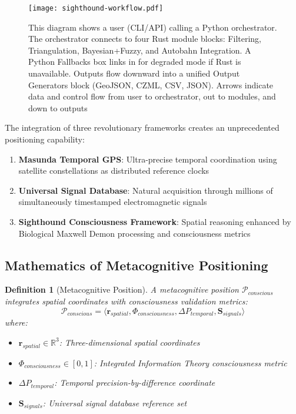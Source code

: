 \documentclass[12pt,a4paper]{article}
\newtheorem{definition}[theorem]{Definition}
\newcommand{\R}{\mathbb{R}}
\begin{document}
\begin{figure}[H]
\centering
\texttt{[image: sighthound-workflow.pdf]}
\caption{This diagram shows a user (CLI/API) calling a Python orchestrator. The orchestrator connects to four Rust module blocks: Filtering, Triangulation, Bayesian+Fuzzy, and Autobahn Integration. A Python Fallbacks box links in for degraded mode if Rust is unavailable. Outputs flow downward into a unified Output Generators block (GeoJSON, CZML, CSV, JSON). Arrows indicate data and control flow from user to orchestrator, out to modules, and down to outputs}
\label{fig:sighthound-workflow}
\end{figure}

The integration of three revolutionary frameworks creates an unprecedented positioning capability:

\begin{enumerate}
\item \textbf{Masunda Temporal GPS}: Ultra-precise temporal coordination using satellite constellations as distributed reference clocks \cite{masunda2025temporal}
\item \textbf{Universal Signal Database}: Natural acquisition through millions of simultaneously timestamped electromagnetic signals \cite{masunda2025signal}
\item \textbf{Sighthound Consciousness Framework}: Spatial reasoning enhanced by Biological Maxwell Demon processing and consciousness metrics \cite{sachikonye2025buhera}
\end{enumerate}

\subsection{Mathematics of Metacognitive Positioning}

\begin{definition}[Metacognitive Position]
A metacognitive position $\mathcal{P}_{conscious}$ integrates spatial coordinates with consciousness validation metrics:
\begin{equation}
\mathcal{P}_{conscious} = \langle \mathbf{r}_{spatial}, \Phi_{consciousness}, \Delta P_{temporal}, \mathbf{S}_{signals} \rangle
\end{equation}
where:
\begin{itemize}
\item $\mathbf{r}_{spatial} \in \R^3$: Three-dimensional spatial coordinates
\item $\Phi_{consciousness} \in [0,1]$: Integrated Information Theory consciousness metric \cite{tononi2008}
\item $\Delta P_{temporal}$: Temporal precision-by-difference coordinate
\item $\mathbf{S}_{signals}$: Universal signal database reference set
\end{itemize}
\end{definition}
\end{document}
